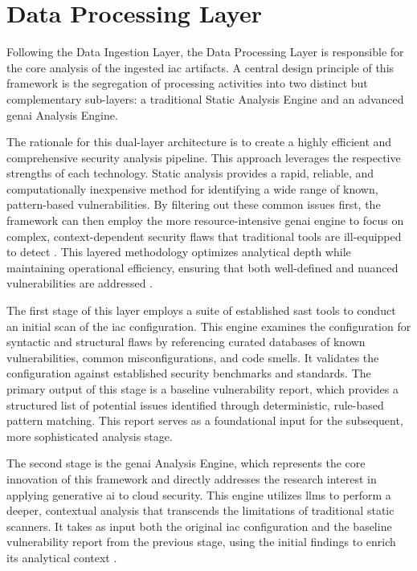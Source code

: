 
\section{Data Processing Layer}
\label{sec:data-processing-layer}

Following the Data Ingestion Layer, the Data Processing Layer is responsible for the core analysis of the ingested \gls{iac} artifacts. A central design principle of this framework is the segregation of processing activities into two distinct but complementary sub-layers: a traditional Static Analysis Engine and an advanced \gls{genai} Analysis Engine.

The rationale for this dual-layer architecture is to create a highly efficient and comprehensive security analysis pipeline. This approach leverages the respective strengths of each technology. Static analysis provides a rapid, reliable, and computationally inexpensive method for identifying a wide range of known, pattern-based vulnerabilities. By filtering out these common issues first, the framework can then employ the more resource-intensive \gls{genai} engine to focus on complex, context-dependent security flaws that traditional tools are ill-equipped to detect \cite{zhang_empirical_2024}. This layered methodology optimizes analytical depth while maintaining operational efficiency, ensuring that both well-defined and nuanced vulnerabilities are addressed \cite{khanna_enhancing_2024}.

The first stage of this layer employs a suite of established \gls{sast} tools to conduct an initial scan of the \gls{iac} configuration. This engine examines the configuration for syntactic and structural flaws by referencing curated databases of known vulnerabilities, common misconfigurations, and code smells. It validates the configuration against established security benchmarks and standards. The primary output of this stage is a baseline vulnerability report, which provides a structured list of potential issues identified through deterministic, rule-based pattern matching. This report serves as a foundational input for the subsequent, more sophisticated analysis stage.

The second stage is the \gls{genai} Analysis Engine, which represents the core innovation of this framework and directly addresses the research interest in applying generative \gls{ai} to cloud security. This engine utilizes \glspl{llm} to perform a deeper, contextual analysis that transcends the limitations of traditional static scanners\cite{noauthor_artificial_2025}. It takes as input both the original \gls{iac} configuration and the baseline vulnerability report from the previous stage, using the initial findings to enrich its analytical context \cite{noauthor_towards_2025}.

